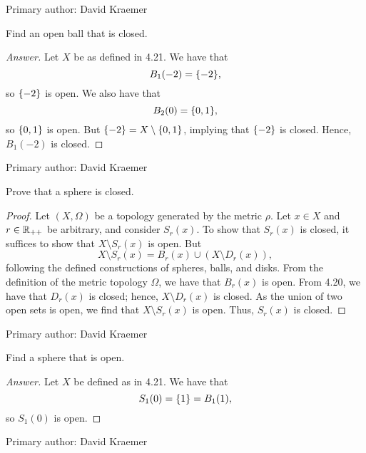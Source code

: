 Primary author: David Kraemer

\begin{minorEx}
    Find an open ball that is closed.
\end{minorEx}

\begin{proof}[Answer]
    Let $X$ be as defined in 4.21. We have that
    \[
        B_1(-2) = \{-2\},
    \]
    so $\{-2\}$ is open. We also have that 
    \[
        B_2(0) = \{0, 1\},
    \]
    so $\{0, 1\}$ is open. But $\{-2\} = X \setminus \{0, 1\}$, implying
    that $\{-2\}$ is closed. Hence, $B_1(-2)$ is closed.   
\end{proof}

Primary author: David Kraemer

\begin{minorEx}
    Prove that a sphere is closed.
\end{minorEx}

\begin{proof}
    Let $(X, \Omega)$ be a topology generated by the metric $\rho$. Let $x \in
    X$ and $r \in \mathbb{R}_{++}$ be arbitrary, and consider $S_{r}(x)$. To show that
    $S_{r}(x)$ is closed, it suffices to show that $X \setminus S_{r}(x)$ is
    open. But
    \[
        X \setminus S_{r}(x) = B_{r}(x) \cup (X \setminus D_{r}(x)),
    \]
    following the defined constructions of spheres, balls, and disks. From the
    definition of the metric topology $\Omega$, we have that $B_{r}(x)$ is open.
    From 4.20, we have that $D_{r}(x)$ is closed; hence, $X \setminus D_{r}(x)$
    is closed. As the union of two open sets is open, we find that $X \setminus
    S_{r}(x)$ is open. Thus, $S_{r}(x)$ is closed.
\end{proof}

Primary author: David Kraemer

\begin{minorEx}
    Find a sphere that is open.
\end{minorEx}

\begin{proof}[Answer]
    Let $X$ be defined as in 4.21. We have that 
    \[
        S_1(0) = \{1\} = B_1(1),
    \]
    so $S_1(0)$ is open.
\end{proof}

Primary author: David Kraemer
